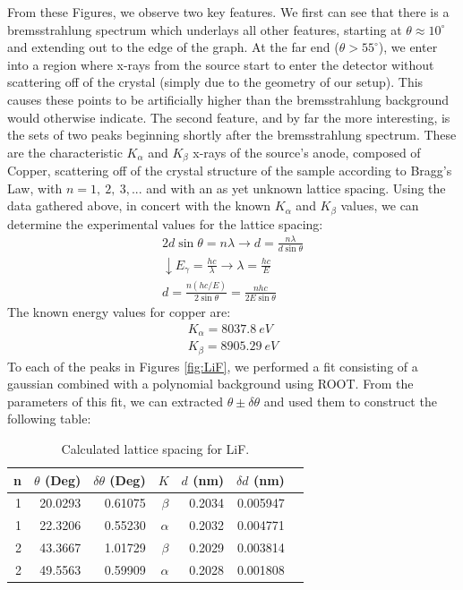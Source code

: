 \documentclass[%
 reprint,
 amsmath,amssymb,
 aps,
 pra,
]{revtex4-1}
\begin{document}
From these Figures, we observe two key features. We first can see that there is a bremsstrahlung spectrum which underlays all other features, starting at $\theta \approx10^\circ$ and extending out to the edge of the graph. At the far end ($\theta > 55^\circ$), we enter into a region where x-rays from the source start to enter the detector without scattering off of the crystal (simply due to the geometry of our setup). This causes these points to be artificially higher than the bremsstrahlung background would otherwise indicate. The second feature, and by far the more interesting, is the sets of two peaks beginning shortly after the bremsstrahlung spectrum. These are the characteristic $K_\alpha$ and $K_\beta$ x-rays of the source's anode, composed of Copper, scattering off of the crystal structure of the sample according to Bragg's Law, with $n = 1,~2,~3,...$ and with an as yet unknown lattice spacing. Using the data gathered above, in concert with the known $K_\alpha$ and $K_\beta$ values, we can determine the experimental values for the lattice spacing:
\begin{gather}
	2d\sin{\theta} = n\lambda \rightarrow d = \frac{n\lambda}{d\sin{\theta}} \nonumber \\
	\downarrow E_\gamma = \frac{hc}{\lambda} \rightarrow \lambda = \frac{hc}{E} \nonumber \\
	d = \frac{n (hc/E)}{2 \sin{\theta}} = \frac{nhc}{2E\sin{\theta}}
\end{gather}
The known energy values for copper are\cite{database1, database2}:
\begin{gather}
	K_\alpha = 8037.8 ~eV \nonumber \\
	K_\beta = 8905.29 ~eV \nonumber
\end{gather}
To each of the peaks in Figures \ref{fig:LiF}, we performed a fit consisting of a gaussian combined with a polynomial background using ROOT. From the parameters of this fit, we can extracted $\theta \pm \delta \theta$ and used them to construct the following table:
\begin{table}[htbp]
	\begin{center}
	\begin{tabular}{|r|r|r|r|r|r|l|}
		\hline
		n & $\theta$ (Deg) & $\delta \theta$ (Deg) & $K$ &  $d$ (nm) & \multicolumn{1}{r|}{$\delta d$ (nm)} \\ \hline
		1 & 20.0293 & 0.61075 & $\beta$ &  0.2034 & 0.005947 \\ \hline
		1 & 22.3206 & 0.55230 & $\alpha$ &  0.2032 & 0.004771 \\ \hline
		2 & 43.3667 & 1.01729 & $\beta$ &  0.2029 & 0.003814 \\ \hline
		2 & 49.5563 & 0.59909 & $\alpha$ &  0.2028 & 0.001808 \\ \hline
	\end{tabular}
	\end{center}
	\caption{Calculated lattice spacing for LiF.}
	\label{table:LiF}
\end{table}
\end{document}
